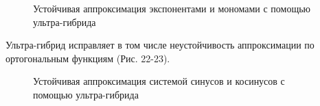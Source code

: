 ﻿\documentclass[a4paper, 12pt]{article}
\begin{document}
\begin{figure}[h!]
    \noindent{}
   \caption{Устойчивая аппроксимация экспонентами и мономами с помощью ультра-гибрида}
    \label{figCurves}
\end{figure}

Ультра-гибрид исправляет в том числе неустойчивость аппроксимации по ортогональным функциям (Рис. 22-23).

\begin{figure}[h!]
    \noindent{}
   \caption{Устойчивая аппроксимация системой синусов и косинусов с помощью ультра-гибрида}
    \label{figCurves}
\end{figure}
\end{document}

